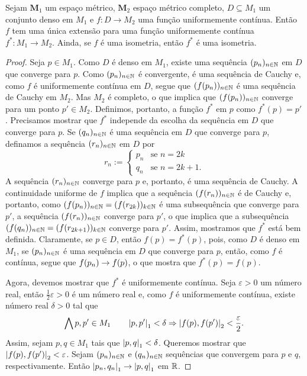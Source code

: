 \begin{theorem}
Sejam $\bm M_1$  um espaço métrico, $\bm M_2$ espaço métrico completo, $D \subseteq M_1$ um conjunto denso em $M_1$ e $f: D \to M_2$ uma função uniformemente contínua. Então $f$ tem uma única extensão para uma função uniformemente contínua $f^*: M_1 \to M_2$. Ainda, se $f$ é uma isometria, então $f^*$ é uma isometria.
\end{theorem}
\begin{proof}
	Seja $p \in M_1$. Como $D$ é denso em $M_1$, existe uma sequência $(p_n)_{n \in \mathbb{N}}$ em $D$ que converge para $p$. Como $(p_n)_{n \in \mathbb{N}}$ é convergente, é uma sequência de Cauchy e, como $f$ é uniformemente contínua em $D$, segue que $(f(p_n))_{n \in \mathbb{N}}$ é uma sequência de Cauchy em $M_2$. Mas $M_2$ é completo, o que implica que $(f(p_n))_{n \in \mathbb{N}}$ converge para um ponto $p' \in M_2$. Definimos, portanto, a função $f^*$ em $p$ como $f^*(p)=p'$. Precisamos mostrar que $f^*$ independe da escolha da sequência em $D$ que converge para $p$. Se $(q_n)_{n \in \mathbb{N}}$ é uma sequência em $D$ que converge para $p$, definamos a sequência $(r_n)_{n \in \mathbb{N}}$ em $D$ por
	\begin{equation*}
	r_n :=
			\begin{cases}
			p_n &\text{se $n=2k$}\\
			q_n &\text{se $n=2k+1$}.
			\end{cases}
	\end{equation*}
A sequência $(r_n)_{n \in \mathbb{N}}$ converge para $p$ e, portanto, é uma sequência de Cauchy. A continuidade uniforme de $f$ implica que a sequência $(f(r_n))_{n \in \mathbb{N}}$ é de Cauchy e, portanto, como $(f(p_n))_{n \in \mathbb{N}}=(f(r_{2k}))_{k \in \mathbb{N}}$ é uma subsequência que converge para $p'$, a sequência $(f(r_n))_{n \in \mathbb{N}}$ converge para $p'$, o que implica que a subsequência $(f(q_n))_{n \in \mathbb{N}}=(f(r_{2k+1}))_{k \in \mathbb{N}}$ converge para $p'$. Assim, mostramos que $f^*$ está bem definida. Claramente, se $p \in D$, então $f(p)=f^*(p)$, pois, como $D$ é denso em $M_1$, se $(p_n)_{n \in \mathbb{N}}$ é uma sequência em $D$ que converge para $p$, então, como $f$ é contínua, segue que $f(p_n) \rightarrow f(p)$, o que mostra que $f^*(p)=f(p)$.

	Agora, devemos mostrar que $f^*$ é uniformemente contínua. Seja $\varepsilon > 0$ um número real, então $\frac{1}{2}\varepsilon > 0$ é um número real e, como $f$ é uniformemente contínua, existe número real $\delta > 0$ tal que
	\begin{equation*}
	\bigwedge\nolimits p,p' \in M_1 \qquad \left\vert{p},{p'}\right\vert_1 < \delta \Rightarrow \left\vert{f(p)},{f(p')}\right\vert_2 < \frac{\varepsilon}{2}.
	\end{equation*}
Assim, sejam $p,q \in M_1$ tais que $\left\vert{p},{q}\right\vert_1 < \delta$. Queremos mostrar que $\left\vert{f(p)},{f(p')}\right\vert_2 < \varepsilon$. Sejam $(p_n)_{n \in \mathbb{N}}$ e $(q_n)_{n \in \mathbb{N}}$ sequências que convergem para $p$ e $q$, respectivamente. Então $\left\vert{p_n},{q_n}\right\vert_1 \rightarrow \left\vert{p},{q}\right\vert_1$ em $\mathbb{R}$.


\end{proof}
